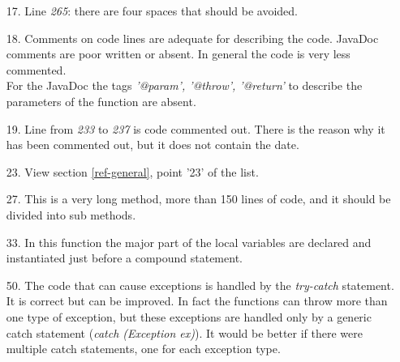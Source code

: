 \begin{itemize}
        \item[17.] 
            Line \textit{265}: there are four spaces that should be avoided.
        \item[18.] 
            Comments on code lines are adequate for describing the code. JavaDoc comments are poor written or absent. In general the code is very less commented.\\
            For the JavaDoc the tags \textit{'@param', '@throw', '@return'} to describe the parameters of the function are absent.
        \item [19.] 
            Line from \textit{233} to \textit{237} is code commented out. There is the reason why it has been commented out, but it does not contain the date.
        \item[23.] 
            View section \ref{ref-general}, point '23' of the list.
        \item[27.] 
            This is a very long method, more than 150 lines of code, and it should be divided into sub methods.
        \item[33.] 
            In this function the major part of the local variables are declared and instantiated just before a compound statement.
        \item[50.] 
            The code that can cause exceptions is handled by the \textit{try-catch} statement. It is correct but can be improved. In fact the functions can throw more than one type of exception, but these exceptions are handled only by a generic catch statement (\textit{catch (Exception ex)}). It would be better if there were multiple catch statements, one for each exception type.
    \end{itemize}